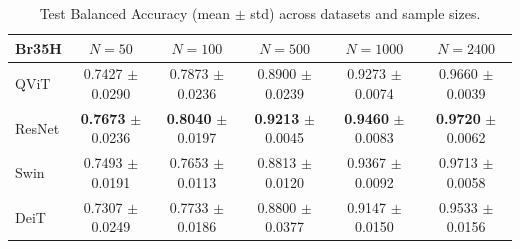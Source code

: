 \begin{table}[htbp]
\centering
\caption{Test Balanced Accuracy (mean $\pm$ std) across datasets and sample sizes.}
\label{tab:test_balacc}
\begin{tabular}{lccccc}
\toprule
\textbf{Br35H} & $N = 50$ & $N = 100$ & $N = 500$ & $N = 1000$ & $N = 2400$ \\
\midrule
QViT & 0.7427 $\pm$ 0.0290 & 0.7873 $\pm$ 0.0236 & 0.8900 $\pm$ 0.0239 & 0.9273 $\pm$ 0.0074 & 0.9660 $\pm$ 0.0039 \\
ResNet & \textbf{0.7673} $\pm$ 0.0236 & \textbf{0.8040} $\pm$ 0.0197 & \textbf{0.9213} $\pm$ 0.0045 & \textbf{0.9460} $\pm$ 0.0083 & \textbf{0.9720} $\pm$ 0.0062 \\
Swin & 0.7493 $\pm$ 0.0191 & 0.7653 $\pm$ 0.0113 & 0.8813 $\pm$ 0.0120 & 0.9367 $\pm$ 0.0092 & 0.9713 $\pm$ 0.0058 \\
DeiT & 0.7307 $\pm$ 0.0249 & 0.7733 $\pm$ 0.0186 & 0.8800 $\pm$ 0.0377 & 0.9147 $\pm$ 0.0150 & 0.9533 $\pm$ 0.0156 \\
\bottomrule
\end{tabular}
\end{table}
